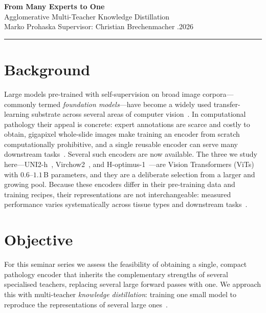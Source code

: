 \documentclass[10pt]{article}
\begin{document}
\begin{center}
{\LARGE\bfseries From Many Experts to One}\\[2pt]
{\large Agglomerative Multi-Teacher Knowledge Distillation}\\[3pt]
{\small Marko Prohaska \;\textbar\; Supervisor: Christian Brechenmacher \;\textbar{}.2026}
\end{center}
\vspace{-3pt}\hrule\vspace{4pt}

\section{Background}

Large models pre-trained with self-supervision on broad image corpora—commonly termed
\emph{foundation models}—have become a widely used transfer-learning substrate across several
areas of computer vision~\cite{bommasani}. In computational pathology their appeal is concrete:
expert annotations are scarce and costly to obtain, gigapixel whole-slide images make training an
encoder from scratch computationally prohibitive, and a single reusable encoder can serve many
downstream tasks~\cite{moor,uni}. Several such encoders are now available. The three we study
here—UNI2-h~\cite{uni}, Virchow2~\cite{virchow2}, and H-optimus-1~\cite{hoptimus}—are Vision
Transformers (ViTs) with $0.6$--$1.1$\,B parameters, and they are a deliberate selection from a
larger and growing pool. Because these encoders differ in their pre-training data and training
recipes, their representations are not interchangeable: measured performance varies systematically
across tissue types and downstream tasks~\cite{pathryoshka}.

\section{Objective}

For this seminar series we assess the feasibility of obtaining a single, compact pathology
encoder that inherits the complementary strengths of several specialised teachers, replacing
several large forward passes with one. We approach this with multi-teacher \emph{knowledge
distillation}: training one small model to reproduce the representations of several large
ones~\cite{hinton,radio}.
\end{document}

